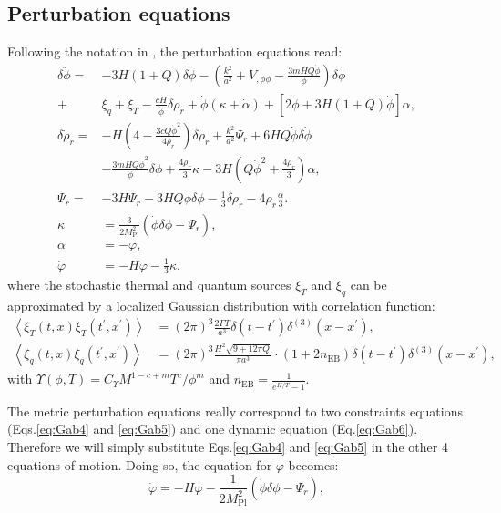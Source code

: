 \subsection{Perturbation equations}
Following the notation in \cite{Das:2020xmh}, the perturbation equations read:
\begin{align}
\delta \ddot{\phi}=&-3 H(1+Q) \delta \dot{\phi}-\left(\frac{k^2}{a^2}+V_{, \phi \phi}-\frac{3m H Q \dot{\phi}}{\phi}\right) \delta \phi \nonumber \\+& \xi_q+\xi_T-\frac{c H}{\dot{\phi}} \delta \rho_r+\dot{\phi}(\kappa+\dot{\alpha})+[2 \ddot{\phi}+3 H(1+Q) \dot{\phi}] \alpha, \label{eq:Gab1} \\ \delta \dot{\rho}_r=&-H\left(4-\frac{3 c Q \dot{\phi}^2}{4 \rho_r}\right) \delta \rho_r+\frac{k^2}{a^2} \Psi_r+6 H Q \dot{\phi} \delta \dot{\phi} \nonumber\\ &-\frac{3m H Q \dot{\phi}^2}{\phi} \delta \phi+\frac{4 \rho_r}{3} \kappa-3 H\left(Q \dot{\phi}^2+\frac{4 \rho_r}{3}\right) \alpha, \label{eq:Gab2}\\ \dot{\Psi}_r=&-3 H \Psi_r-3 H Q \dot{\phi} \delta \phi-\frac{1}{3} \delta \rho_r-4 \rho_r \frac{\alpha}{3} . \label{eq:Gab3}\\
 \kappa &=\frac{3}{2 M_{\mathrm{Pl}}^2}\left(\dot{\phi} \delta \phi-\Psi_r\right), \label{eq:Gab4} \\ \alpha &=-\varphi,\label{eq:Gab5} \\ \dot{\varphi} &=-H \varphi-\frac{1}{3} \kappa . \label{eq:Gab6}
 \end{align}
where the stochastic thermal and quantum sources $\xi_T$ and $\xi_q$ can be approximated by a localized Gaussian distribution with correlation function:
\begin{align}
    \left\langle\xi_T(t, x) \xi_T\left(t^{\prime}, x^{\prime}\right)\right\rangle&=(2\pi)^3\frac{2\Gamma T}{ a^3}\delta\left(t-t^{\prime}\right) \delta^{(3)}\left(x-x^{\prime}\right), \\
    \left\langle\xi_q(t, x) \xi_q\left(t^{\prime}, x^{\prime}\right)\right\rangle&=(2\pi)^3\frac{H^2\sqrt{9+12\pi Q}}{ \pi a^3}\cdot(1+2n_{\mathrm{EB}})\delta\left(t-t^{\prime}\right) \delta^{(3)}\left(x-x^{\prime}\right),    
\end{align}
with $\Upsilon(\phi, T)=C_{\Upsilon} M^{1-c+m} T^c/ \phi^m$ and $n_{\mathrm{EB}}=\frac{1}{e^{H/T}-1}$.

The metric perturbation equations really correspond to two constraints equations (Eqs.\ref{eq:Gab4} and \ref{eq:Gab5}) and one dynamic equation (Eq.\ref{eq:Gab6}). Therefore we will simply substitute Eqs.\ref{eq:Gab4} and \ref{eq:Gab5} in the other 4 equations of motion. Doing so, the equation for $\varphi$ becomes:
\begin{equation}
  \dot{\varphi} =-H \varphi- \frac{1}{2 M_{\mathrm{Pl}}^2}\left(\dot{\phi} \delta \phi-\Psi_r\right),
\end{equation}

